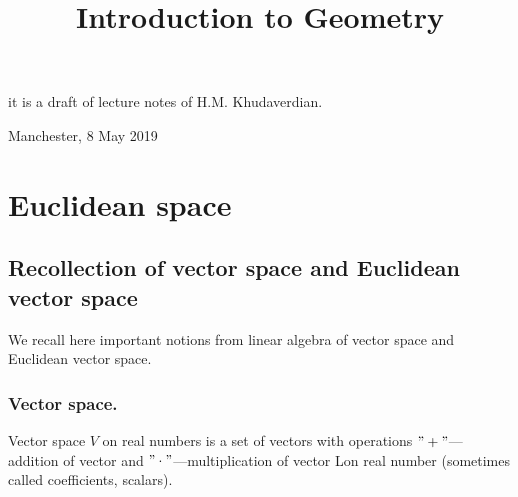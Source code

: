 \documentclass[12pt]{article}
\title{Introduction to  Geometry}
\date{}
\numberwithin{equation}{section}
\begin{document}
\maketitle

  \centerline {it is a draft of lecture notes of H.M. Khudaverdian.}

  \centerline { Manchester, 8 May 2019}

\tableofcontents
{}

\newpage
\section {Euclidean space}

\subsection{Recollection of vector space and Euclidean vector
space}

We recall here important notions from linear algebra
of vector space and Euclidean vector space.


\subsubsection {Vector space.}


\bigskip

Vector space $V$ on real numbers is a set of 
vectors with operations
$"+"$---addition of vector and 
$"\cdot"$---multiplication of vector
Lon real number (sometimes called coefficients, scalars). 

\m
\end{document}
